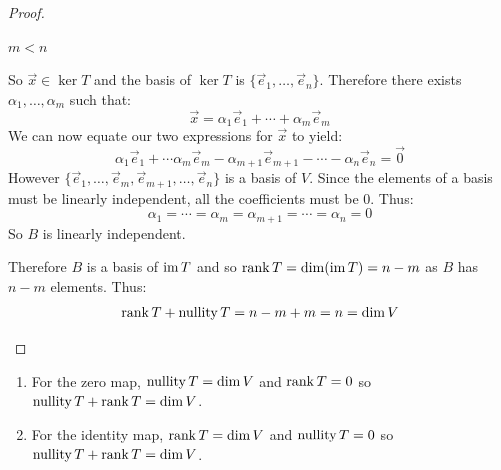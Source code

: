 \documentclass[../main.tex]{subfiles}
\begin{document}
\begin{proof}
\begin{proofcases}
\begin{case}{$m < n$}
\begin{enumerate}
      So $\vec{x} \in \ker T$ and the basis of $\ker T$ is $\{\vec{e}_1, \ldots, \vec{e}_n\}$.
      Therefore there exists $\alpha_1, \ldots, \alpha_m$ such that:
      \[
        \vec{x} = \alpha_1 \vec{e}_1 + \cdots + \alpha_m \vec{e}_m
      \]
      We can now equate our two expressions for $\vec{x}$ to yield:
      \[
        \alpha_1 \vec{e}_1 + \cdots \alpha_m \vec{e}_m - \alpha_{m + 1}\vec{e}_{m + 1} - \cdots - \alpha_n \vec{e}_n = \vec{0}
      \]
      However $\{\vec{e}_1, \ldots, \vec{e}_m, \vec{e}_{m + 1}, \ldots, \vec{e}_n\}$ is a basis of $V$.
      Since the elements of a basis must be linearly independent, all the coefficients must be 0.
      Thus:
      \[
        \alpha_1 = \cdots = \alpha_m = \alpha_{m + 1} = \cdots = \alpha_n = 0
      \]
      So $B$ is linearly independent.
    \end{enumerate}
    Therefore $B$ is a basis of $\operatorname{im} T$ and so $\operatorname{rank} T = \dim(\operatorname{im} T) = n - m$ as $B$ has $n - m$ elements.
    Thus:
    \[
      \operatorname{rank} T + \operatorname{nullity} T = n - m + m = n = \dim V
    \]
  \end{case}
\end{proofcases}
\end{proof}
\begin{example}
  \begin{enumerate}
    \item For the zero map, $\operatorname{nullity} T = \dim V$ and $\operatorname{rank} T = 0$ so $\operatorname{nullity} T + \operatorname{rank} T = \dim V$.
    \item For the identity map, $\operatorname{rank} T = \dim V$ and $\operatorname{nullity} T = 0$ so $\operatorname{nullity} T + \operatorname{rank} T = \dim V$.
  \end{enumerate}
\end{example}
\end{document}
